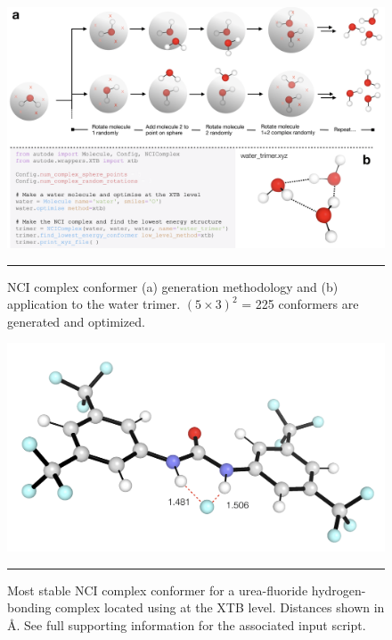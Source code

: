 \documentclass[../../main.tex]{subfiles}
\begin{document}
\begin{figure}[h!]
	\vspace{0.4cm}
	\centering
	\includegraphics[width=\textwidth]{5/autode/figs/figS11}
	\vspace{0.4cm}
	\hrule
	\caption{NCI complex conformer (a) generation methodology and (b) application to the water trimer. $(5\times3)^2$ = 225 conformers are generated and optimized.}
	\label{fig::ade_si_11}
\end{figure}



\begin{figure}[h!]
	\vspace{0.4cm}
	\centering
	\includegraphics[width=12cm]{5/autode/figs/figS12}
	\vspace{0.4cm}
	\hrule
	\caption{Most stable NCI complex conformer for a urea-fluoride hydrogen-bonding complex located using \ade at the XTB level. Distances shown in \AA. See full supporting information for the associated input script.}
	\label{fig::ade_si_12}
\end{figure}

\clearpage
\end{document}
